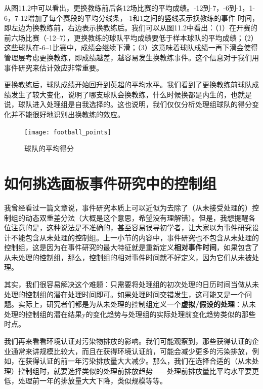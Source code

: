 \documentclass[cn,12pt,math=newtx,citestyle=gb7714-2015,bibstyle=gb7714-2015]{elegantbook}
\begin{document}
    从图11.2中可以看出，更换教练前后各12场比赛的平均成绩。-12到-7，-6到-1，1-6，7-12增加了每个赛段的平均分线条，-1和1之间的竖线表示换教练的事件-时间，即左边为换教练前，右边表示换教练后。我们可以从图11.2中看出：（1）在开赛的前六场比赛（-12--7），更换教练的球队平均成绩要低于样本球队的平均成绩；（2）这些球队在-6--1比赛中，成绩会继续下滑；（3）这意味着球队成绩一再下滑会使得管理层考虑更换教练，即成绩越差，越容易发生换教练事件。这个信息对于我们用事件研究来估计效应非常重要。
    
    更换教练后，球队成绩开始回升到英超的平均水平。我们看到了更换教练前球队成绩发生了较大变化，说明了哪支球队会换教练，什么时候换都是内生的，也就是说，球队进入处理组是自我选择的。这也说明，我们仅仅分析处理组球队的得分变化并不能很好地识别出换教练的效应。

	
	\begin{figure}[tbph]
		\centering
		\texttt{[image: football\_points]}
		\caption{球队的平均得分}
		\label{fig:footballpionts}
	\end{figure}


       \section{如何挑选面板事件研究中的控制组}

       我曾经看过一篇文章说，事件研究本质上可以近似为去除了（从未接受处理的）控制组的动态双重差分法（大概是这个意思，希望没有理解错）。但是，我想提醒各位注意的是，这种说法是不准确的，甚至容易误导初学者，让大家以为事件研究设计不能包含从未处理的控制组。上一小节的内容中，事件研究也不包含从未处理的控制组，这是因为在事件研究的最大特征就是重新定义\textbf{相对事件时间}，如果包含了从未处理的控制组，那么，控制组的相对事件时间就不好定义，因为它们从未被处理。
       
       其实，我们很容易解决这个难题：只需要将处理组的初次处理的日历时间当做从未处理的控制组的潜在处理时间即可。如果处理时间交错发生，这可能又是一个问题。实际上，研究者们都是为从未处理的控制组定义一个\textbf{虚拟/假设的处理}：从未处理的控制组的潜在结果y的变化趋势与处理组的实际处理前变化趋势类似的那些时点。
       
       我们再来看看环境认证对污染物排放的影响。我们可能观察到，那些获得认证的企业通常来讲规模比较大，而且在获得环境认证前，可能会减少更多的污染排放，例如，在获得认证的前一年污染排放量大大减少。那么，我们在选择合适的（从未处理）控制组时，就要选择类似的处理前排放趋势——处理前排放量比平均水平要更低，处理前一年的排放量大大下降，类似规模等等。
	    
\end{document}
